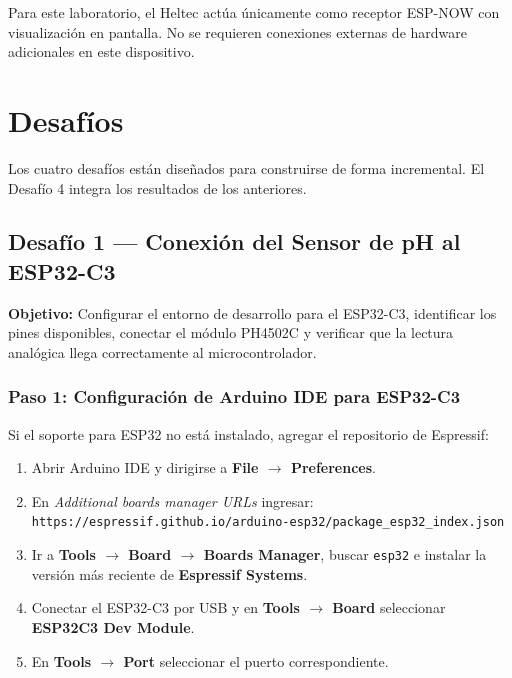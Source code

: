 \documentclass[12pt,leqno]{article}
\begin{document}
\noindent Para este laboratorio, el Heltec act\'ua \'unicamente como receptor
ESP-NOW con visualizaci\'on en pantalla. No se requieren conexiones externas de
hardware adicionales en este dispositivo.

\newpage
\section{Desaf\'ios}

Los cuatro desaf\'ios est\'an dise\~nados para construirse de forma incremental.
El Desaf\'io 4 integra los resultados de los anteriores.

\bigskip

\subsection{Desaf\'io 1 --- Conexi\'on del Sensor de pH al ESP32-C3}

\textbf{Objetivo:} Configurar el entorno de desarrollo para el ESP32-C3, identificar
los pines disponibles, conectar el m\'odulo PH4502C y verificar que la lectura
anal\'ogica llega correctamente al microcontrolador.

\subsubsection*{Paso 1: Configuraci\'on de Arduino IDE para ESP32-C3}

Si el soporte para ESP32 no est\'a instalado, agregar el repositorio de Espressif:

\begin{enumerate}[(1)]
    \item Abrir Arduino IDE y dirigirse a \textbf{File $\rightarrow$ Preferences}.
    \item En \textit{Additional boards manager URLs} ingresar:\\
    \texttt{\small https://espressif.github.io/arduino-esp32/package\_esp32\_index.json}
    \item Ir a \textbf{Tools $\rightarrow$ Board $\rightarrow$ Boards Manager},
    buscar \texttt{esp32} e instalar la versi\'on m\'as reciente de
    \textbf{Espressif Systems}.
    \item Conectar el ESP32-C3 por USB y en \textbf{Tools $\rightarrow$ Board}
    seleccionar \textbf{ESP32C3 Dev Module}.
    \item En \textbf{Tools $\rightarrow$ Port} seleccionar el puerto correspondiente.
\end{enumerate}
\end{document}
